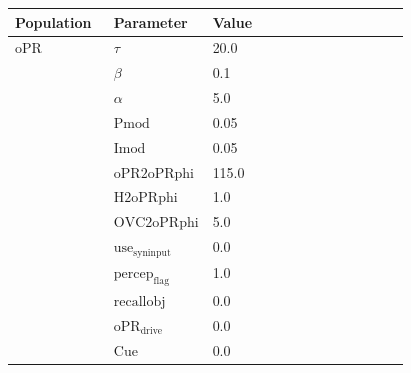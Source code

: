 \documentclass{article}
\begin{document}
\noindent
\begin{tabularx}{\linewidth}{|p{0.25\linewidth}|p{0.25\linewidth}|X|}\hline
\textbf{Population} & \textbf{Parameter} & \textbf{Value}   \\ \hline

    oPR             & $\tau$        & 20.0  \\ \hline

                 & $\beta$        & 0.1  \\ \hline

                 & $\alpha$        & 5.0  \\ \hline

                 & ${\text{Pmod}}$        & 0.05  \\ \hline

                 & ${\text{Imod}}$        & 0.05  \\ \hline

                 & ${\text{oPR2oPRphi}}$        & 115.0  \\ \hline

                 & ${\text{H2oPRphi}}$        & 1.0  \\ \hline

                 & ${\text{OVC2oPRphi}}$        & 5.0  \\ \hline

                 & ${\text{use}}_{\text{syninput}}$        & 0.0  \\ \hline

                 & ${\text{percep}}_{\text{flag}}$        & 1.0  \\ \hline

                 & ${\text{recallobj}}$        & 0.0  \\ \hline

                 & ${\text{oPR}}_{\text{drive}}$        & 0.0  \\ \hline

                 & ${\text{Cue}}$        & 0.0  \\ \hline

\end{tabularx}

\vspace{2ex}
\end{document}
